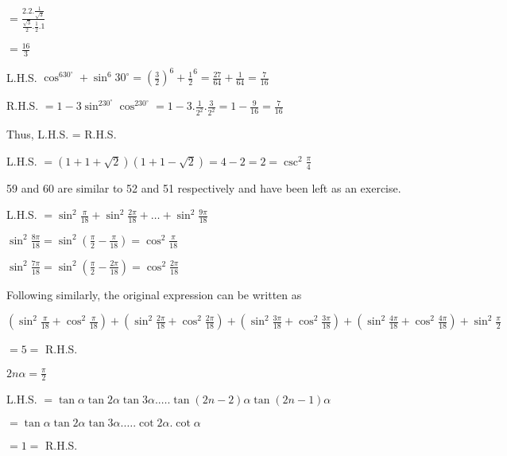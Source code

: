   $= \frac{2.2.\frac{1}{\sqrt{3}}}{\frac{\sqrt{3}}{2}.\frac{1}{2}.1}$

  $= \frac{16}{3}$

\item L.H.S. $\cos^630^\circ + \sin^6 30^\circ = \left(\frac{3}{2}\right)^6 + \frac{1}{2}^6 = \frac{27}{64} + \frac{1}{64} =
  \frac{7}{16}$

  R.H.S. $= 1 - 3\sin^230^\circ\cos^230^\circ = 1 - 3.\frac{1}{2^2}.\frac{3}{2^2} = 1 - \frac{9}{16} = \frac{7}{16}$

  Thus, L.H.S. = R.H.S.

\item L.H.S. $= \left(1 + 1 + \sqrt{2}\right)(1 + 1 - \sqrt{2}) = 4 - 2 = 2 = \csc^2\frac{\pi}{4}$


  59 and 60 are similar to 52 and 51 respectively and have been left as an exercise.


\item L.H.S. $= \sin^2 \frac{\pi}{18} + \sin^2\frac{2\pi}{18} + \ldots + \sin^2\frac{9\pi}{18}$

  $\sin^2\frac{8\pi}{18} = \sin^2\left(\frac{\pi}{2} - \frac{\pi}{18}\right) = \cos^2\frac{\pi}{18}$

  $\sin^2\frac{7\pi}{18} = \sin^2\left(\frac{\pi}{2} - \frac{2\pi}{18}\right) = \cos^2\frac{2\pi}{18}$

  Following similarly, the original expression can be written as

  $\left(\sin^2 \frac{\pi}{18} + \cos^2\frac{\pi}{18}\right) + \left(\sin^2 \frac{2\pi}{18} +
  \cos^2\frac{2\pi}{18}\right) + \left(\sin^2 \frac{3\pi}{18} + \cos^2\frac{3\pi}{18}\right) + \left(\sin^2 \frac{4\pi}{18} +
  \cos^2\frac{4\pi}{18}\right) + \sin^2 \frac{\pi}{2}$

  $= 5 =$ R.H.S.

\item $2n\alpha = \frac{\pi}{2}$

  L.H.S. $= \tan\alpha\tan2\alpha\tan3\alpha. \ldots .\tan(2n - 2)\alpha\tan(2n - 1)\alpha$

  $= \tan\alpha\tan2\alpha\tan3\alpha. \ldots .\cot2\alpha.\cot\alpha$

  $= 1 =$ R.H.S.
\stopitemize
